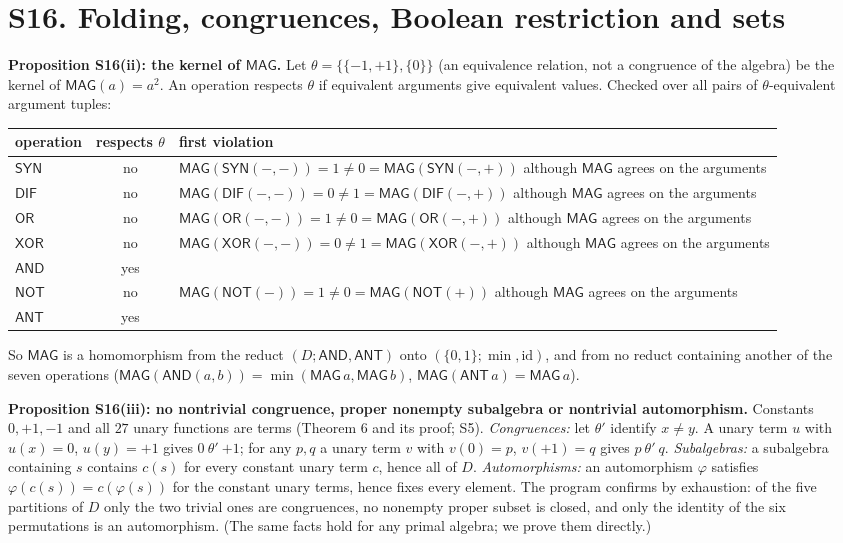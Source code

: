 \documentclass[10pt,a4paper]{article}
\newcommand{\D}{D}\newcommand{\Z}{\mathcal Z}\newcommand{\SYN}{\mathsf{SYN}}\newcommand{\DIF}{\mathsf{DIF}}\newcommand{\OR}{\mathsf{OR}}\newcommand{\XOR}{\mathsf{XOR}}\newcommand{\AND}{\mathsf{AND}}\newcommand{\NOT}{\mathsf{NOT}}\newcommand{\ANT}{\mathsf{ANT}}\newcommand{\MAX}{\mathsf{MAX}}\newcommand{\MIN}{\mathsf{MIN}}\newcommand{\MAG}{\mathsf{MAG}}\newcommand{\chai}{Chai}\newcommand{\Fone}{\mathcal F_1}\newcommand{\Ftwo}{\mathcal F_2}\usepackage{tikz}\usetikzlibrary{arrows.meta,positioning}\newcommand{\yang}{\rule{0.8em}{0.18ex}}\newcommand{\yin}{\rule{0.25em}{0.18ex}\hspace{0.3em}\rule{0.25em}{0.18ex}}\newcommand{\tri}[3]{\raisebox{-0.01ex}{\shortstack[c]{#1\\[-0.3ex]#2\\[-0.3ex]#3}}}\newcommand{\iv}[1]{[\![#1]\!]}
\begin{document}
\section*{S16. Folding, congruences, Boolean restriction and sets}
\textbf{Proposition S16(ii): the kernel of $\mathsf{MAG}$.} Let $\theta=\{\{-1,+1\},\{0\}\}$ (an equivalence relation, not a congruence of the algebra) be the kernel of $\mathsf{MAG}(a)=a^2$. An operation respects $\theta$ if equivalent arguments give equivalent values. Checked over all pairs of $\theta$-equivalent argument tuples:
\begin{center}\small\begin{tabular}{lcp{10cm}}\toprule operation&respects $\theta$&first violation\\\midrule
$\SYN$&no&$\MAG(\SYN(-,-))=1\ne0=\MAG(\SYN(-,+))$ although $\MAG$ agrees on the arguments\\
$\DIF$&no&$\MAG(\DIF(-,-))=0\ne1=\MAG(\DIF(-,+))$ although $\MAG$ agrees on the arguments\\
$\OR$&no&$\MAG(\OR(-,-))=1\ne0=\MAG(\OR(-,+))$ although $\MAG$ agrees on the arguments\\
$\XOR$&no&$\MAG(\XOR(-,-))=0\ne1=\MAG(\XOR(-,+))$ although $\MAG$ agrees on the arguments\\
$\AND$&yes&\\
$\NOT$&no&$\MAG(\NOT(-))=1\ne0=\MAG(\NOT(+))$ although $\MAG$ agrees on the arguments\\
$\ANT$&yes&\\
\bottomrule\end{tabular}\end{center}
So $\mathsf{MAG}$ is a homomorphism from the reduct $(\D;\mathsf{AND},\mathsf{ANT})$ onto $(\{0,1\};\min,\mathrm{id})$, and from no reduct containing another of the seven operations ($\mathsf{MAG}(\mathsf{AND}(a,b))=\min(\mathsf{MAG}\,a,\mathsf{MAG}\,b)$, $\mathsf{MAG}(\mathsf{ANT}\,a)=\mathsf{MAG}\,a$).

\textbf{Proposition S16(iii): no nontrivial congruence, proper nonempty subalgebra or nontrivial automorphism.} Constants $0,+1,-1$ and all $27$ unary functions are terms (Theorem 6 and its proof; S5). \emph{Congruences:} let $\theta'$ identify $x\neq y$. A unary term $u$ with $u(x)=0$, $u(y)=+1$ gives $0\ \theta'\ {+1}$; for any $p,q$ a unary term $v$ with $v(0)=p$, $v(+1)=q$ gives $p\ \theta'\ q$. \emph{Subalgebras:} a subalgebra containing $s$ contains $c(s)$ for every constant unary term $c$, hence all of $\D$. \emph{Automorphisms:} an automorphism $\varphi$ satisfies $\varphi(c(s))=c(\varphi(s))$ for the constant unary terms, hence fixes every element. The program confirms by exhaustion: of the five partitions of $\D$ only the two trivial ones are congruences, no nonempty proper subset is closed, and only the identity of the six permutations is an automorphism. (The same facts hold for any primal algebra; we prove them directly.)
\end{document}
